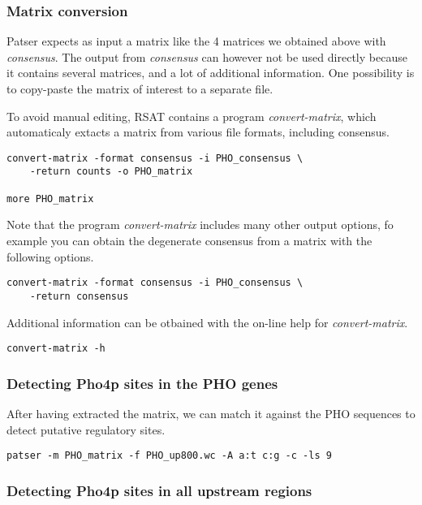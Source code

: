 \subsubsection{Matrix conversion}

Patser expects as input a matrix like the 4 matrices we obtained above
with \textit{consensus}. The output from \textit{consensus} can however
not be used directly because it contains several matrices, and a lot
of additional information. One possibility is to copy-paste the matrix
of interest to a separate file.

To avoid manual editing, RSAT contains a program
\textit{convert-matrix}, which automaticaly extacts a matrix from
various file formats, including consensus.

\begin{verbatim}
convert-matrix -format consensus -i PHO_consensus \
    -return counts -o PHO_matrix 

more PHO_matrix
\end{verbatim}

Note that the program \textit{convert-matrix} includes many other
output options, fo example you can obtain the degenerate consensus
from a matrix with the following options.

\begin{verbatim}
convert-matrix -format consensus -i PHO_consensus \
    -return consensus
\end{verbatim}

Additional information can be otbained with the on-line help for
\textit{convert-matrix}.

\begin{verbatim}
convert-matrix -h
\end{verbatim}

\subsubsection{Detecting Pho4p sites in the PHO genes}

After having extracted the matrix, we can match it against the PHO
sequences to detect putative regulatory sites.

\begin{verbatim}
patser -m PHO_matrix -f PHO_up800.wc -A a:t c:g -c -ls 9
\end{verbatim}

\subsubsection{Detecting Pho4p sites in all upstream regions}

